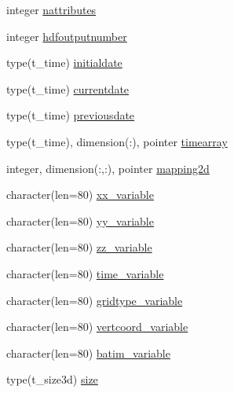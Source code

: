 \begin{DoxyCompactItemize}
\item 
integer \mbox{\hyperlink{structmoduleera40format_1_1t__era40format_a3fd941b9807eb0043373c42c8d71c23c}{nattributes}}
\item 
integer \mbox{\hyperlink{structmoduleera40format_1_1t__era40format_a705ed079b9d886e6d4e4bad2c0af187e}{hdfoutputnumber}}
\item 
type(t\+\_\+time) \mbox{\hyperlink{structmoduleera40format_1_1t__era40format_abec035b64dd8523750690b1e42aab619}{initialdate}}
\item 
type(t\+\_\+time) \mbox{\hyperlink{structmoduleera40format_1_1t__era40format_a19cb6da0a3c3858f6c24854a52ab6f41}{currentdate}}
\item 
type(t\+\_\+time) \mbox{\hyperlink{structmoduleera40format_1_1t__era40format_a7b1248583f6901957fde778938340650}{previousdate}}
\item 
type(t\+\_\+time), dimension(\+:), pointer \mbox{\hyperlink{structmoduleera40format_1_1t__era40format_ade60c6155b282c4d9f7d3473f05c8dc2}{timearray}}
\item 
integer, dimension(\+:,\+:), pointer \mbox{\hyperlink{structmoduleera40format_1_1t__era40format_a315fe11c132cd65c89f5babffb24f274}{mapping2d}}
\item 
character(len=80) \mbox{\hyperlink{structmoduleera40format_1_1t__era40format_ae5669eeff6ceb47481094d3d0c22c44e}{xx\+\_\+variable}}
\item 
character(len=80) \mbox{\hyperlink{structmoduleera40format_1_1t__era40format_ac957655400c91e6abcaa59ab6def87f9}{yy\+\_\+variable}}
\item 
character(len=80) \mbox{\hyperlink{structmoduleera40format_1_1t__era40format_a84ccd09939682702a41e3923a3c4a672}{zz\+\_\+variable}}
\item 
character(len=80) \mbox{\hyperlink{structmoduleera40format_1_1t__era40format_a97eaff54cdfab9324821ed66dc97429f}{time\+\_\+variable}}
\item 
character(len=80) \mbox{\hyperlink{structmoduleera40format_1_1t__era40format_a2ccc32085f72740263ef974c1cb6de61}{gridtype\+\_\+variable}}
\item 
character(len=80) \mbox{\hyperlink{structmoduleera40format_1_1t__era40format_a6cee6a5bdcf6b054f16b3a93f89f79e6}{vertcoord\+\_\+variable}}
\item 
character(len=80) \mbox{\hyperlink{structmoduleera40format_1_1t__era40format_aa31134441e188e36a6ce9b2101210ed1}{batim\+\_\+variable}}
\item 
type(t\+\_\+size3d) \mbox{\hyperlink{structmoduleera40format_1_1t__era40format_a77ac21434108d2277ff1624a47d32310}{size}}

\end{DoxyCompactItemize}
